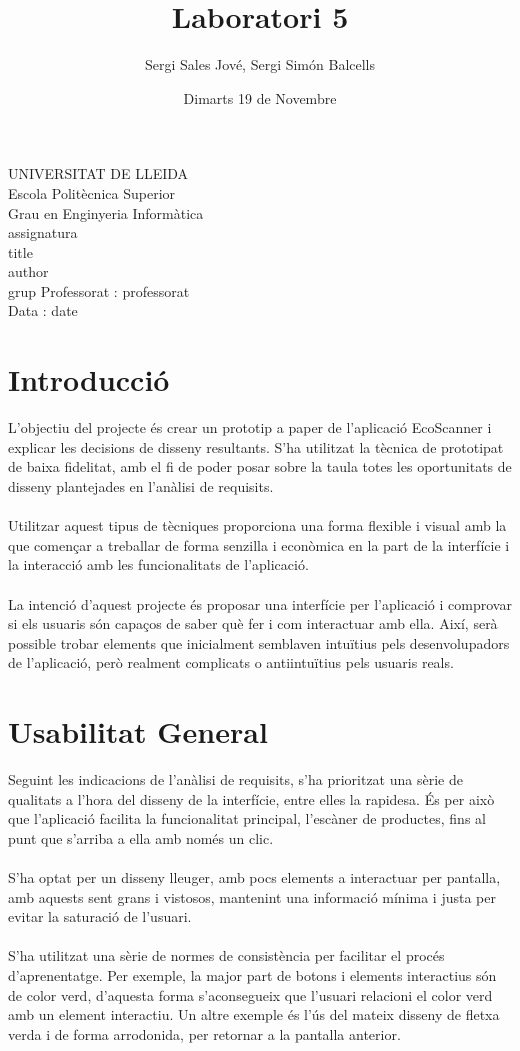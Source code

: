 \documentclass{article}
\title{Laboratori 5}
\author{Sergi Sales Jové, Sergi Simón Balcells}
\date{Dimarts 19 de Novembre}
\renewcommand{\maketitle}{ %
    \begin{titlepage}
        \raggedright{UNIVERSITAT DE LLEIDA \\
            Escola Politècnica Superior \\
            Grau en Enginyeria Informàtica\\
            \1assignatura\\}
            \vspace{5cm}
            \centering\huge{\5title \\}
            \vspace{3cm}
            \large{\6author} \\
            \normalsize{\3grup}
            \vfill
            Professorat : \4professorat \\
            Data : \7date
\end{titlepage}}
\begin{document}
\maketitle
\thispagestyle{empty}

\newpage
{}
\tableofcontents
\newpage
{}

\section{Introducció}
L'objectiu del projecte és crear un prototip a paper de l'aplicació
EcoScanner i explicar les decisions de disseny resultants. S'ha utilitzat la
tècnica de prototipat de baixa fidelitat, amb el fi de poder posar
sobre la taula totes les oportunitats de disseny plantejades en l'anàlisi
de requisits.\\
\\
Utilitzar aquest tipus de tècniques proporciona una forma flexible i visual
amb la que començar a treballar de forma senzilla i econòmica en la part
de la interfície i la interacció amb les funcionalitats de l'aplicació.\\
\\
La intenció d'aquest projecte és proposar una interfície per l'aplicació
i comprovar si els usuaris són capaços de saber què fer i com interactuar
amb ella. Així, serà possible trobar elements que inicialment
semblaven intuïtius pels desenvolupadors de l'aplicació, però realment
complicats o antiintuïtius pels usuaris reals. \\
%
\section{Usabilitat General}
Seguint les indicacions de l'anàlisi de requisits, s'ha prioritzat una
sèrie de qualitats a l'hora del disseny de la interfície, entre
elles la rapidesa.
És per això que l'aplicació facilita la funcionalitat principal,
l'escàner de productes, fins al punt que s'arriba a ella amb
només un clic.
\\\\
S'ha optat per un disseny lleuger, amb pocs elements a interactuar
per pantalla, amb aquests sent grans i vistosos, mantenint una informació
mínima i justa per evitar la saturació de l'usuari.
\\\\
S'ha utilitzat una sèrie de normes de consistència per facilitar el procés
d'aprenentatge. Per exemple, la major part de botons i elements
interactius són de color verd, d'aquesta forma s'aconsegueix que l'usuari
relacioni el color verd amb un element interactiu. Un altre
exemple és l'ús del mateix disseny de fletxa verda i de forma
arrodonida, per retornar a la
pantalla anterior.
\end{document}
